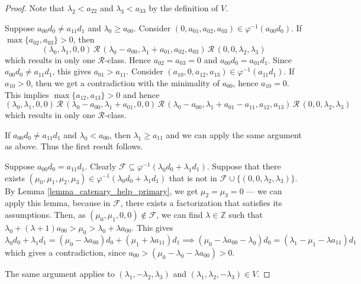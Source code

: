 \documentclass[12pt]{article}
\theoremstyle{remark}
\begin{document}
\begin{proof}
    Note that $\lambda_2< a_{22}$ and $\lambda_3 < a_{33}$ by the definition of $V$.
    
    Suppose $a_{00}d_0 \neq a_{11}d_1$ and $\lambda_0 \geq a_{00}$. Consider $(0,a_{01},a_{02},a_{03}) \in \varphi^{-1}(a_{00}d_0)$. If $\max \{a_{02},a_{03}\} > 0$, then
    \begin{equation}
        (\lambda_0,\lambda_1,0,0) \, \mathcal{R} \, (\lambda_0 - a_{00},\lambda_1 + a_{01},a_{02},a_{03}) \, \mathcal{R} \, (0,0,\lambda_2,\lambda_3)
    \end{equation}
    which results in only one $\mathcal{R}$-class. Hence $a_{02}=a_{03}=0$ and $a_{00}d_0 = a_{01}d_1$. Since $a_{00}d_0 \neq a_{11}d_1$, this gives $a_{01} > a_{11}$. Consider $(a_{10},0,a_{12},a_{13}) \in \varphi^{-1}(a_{11}d_1)$. If $a_{10}>0$, then we get a contradiction with the minimality of $a_{00}$, hence $a_{10}=0$. This implies  $\max \{a_{12},a_{13}\} > 0$ and hence 
    \begin{equation}
        (\lambda_0,\lambda_1,0,0) \, \mathcal{R} \, (\lambda_0 - a_{00},\lambda_1 + a_{01},0,0) \, \mathcal{R} \, (\lambda_0 - a_{00},\lambda_1 + a_{01}-a_{11},a_{12},a_{13}) \, \mathcal{R} \, (0,0,\lambda_2,\lambda_3)
    \end{equation}
    which results in only one $\mathcal{R}$-class. 
    
    If $a_{00}d_0 \neq a_{11}d_1$ and $\lambda_0 < a_{00}$, then $\lambda_1 \geq a_{11}$ and we can apply the same argument as above. Thus the first result follows.

    Suppose $a_{00}d_0 = a_{11}d_1$. Clearly $\mathcal{F} \subseteq \varphi^{-1}(\lambda_0d_0 + \lambda_1d_1)$. Suppose that there exists $(\mu_0,\mu_1,\mu_2,\mu_3) \in \varphi^{-1}(\lambda_0d_0 + \lambda_1d_1)$ that is not in $\mathcal{F} \cup \{(0,0,\lambda_2,\lambda_3)\}$.  By Lemma \ref{lemma_catenary_help_primary}, we get $\mu_2=\mu_3 = 0$ --- we can apply this lemma, because in $\mathcal{F}$, there exists a factorization that satisfies its assumptions. Then, as $(\mu_0,\mu_1,0,0) \notin \mathcal{F}$, we can find $\lambda \in \mathbb{Z}$ such that $\lambda_0 + (\lambda+1)a_{00} > \mu_0 > \lambda_0 + \lambda a_{00}$. This gives
    \begin{equation}
        \lambda_0d_0 + \lambda_1d_1 = (\mu_0 - \lambda a_{00})d_0 + (\mu_1 + \lambda a_{11})d_1 \implies (\mu_0 -\lambda a_{00} - \lambda_0)d_0 = (\lambda_1 - \mu_1 - \lambda a_{11})d_1  
    \end{equation}
    which gives a contradiction, since $ a_{00} > (\mu_0 - \lambda_0 - \lambda a_{00}) > 0$.

    The same argument applies to $(\lambda_1,-\lambda_2,\lambda_3)$ and $(\lambda_1,\lambda_2,-\lambda_3) \in V$.
\end{proof}
\end{document}
